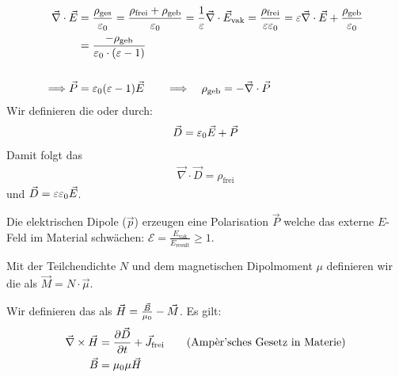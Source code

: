 \begin{align*}
    \vec{\nabla} \cdot \vec{E} &= \frac{\rho_{\text{ges}}}{\varepsilon_0} =
    \frac{\rho_{\text{frei}} + \rho_{\text{geb}}}{\varepsilon_0} =
    \frac{1}{\varepsilon} \vec{\nabla} \cdot \vec{E}_{\text{vak}} =
    \frac{\rho_{\text{frei}}}{\varepsilon \varepsilon_0} =
    \varepsilon \vec{\nabla} \cdot \vec{E} + \frac{\rho_{\text{geb}}}{\varepsilon_0}
    \\ &=
    \frac{- \rho_{\text{geb}}}{\varepsilon_0 \cdot (\varepsilon -1)}
    \\ \\
    \Longrightarrow \vec{P} &= \varepsilon_0 (\varepsilon -1) \vec{E}
    \quad \quad \Longrightarrow \quad
    \rho_{\text{geb}} = - \vec{\nabla} \cdot \vec{P}
\end{align*}
Wir definieren die  oder  durch:
\begin{align*}
    \vec{D} = \varepsilon_0 \vec{E} + \vec{P}
\end{align*}
Damit folgt das 
\begin{align*}
    \vec{\nabla} \cdot \vec{D} = \rho_{\text{frei}}
\end{align*}
und $\vec{D} = \varepsilon \varepsilon_0 \vec{E}$.

\vspace{1\baselineskip}

Die elektrischen Dipole ($\vec{p}$) erzeugen eine Polarisation $\vec{P}$ welche das externe
$E$-Feld im Material schwächen: $\mathcal{E} = \frac{E_{\text{vak}}}{E_{\text{result}}} \geq 1$.

\vspace{1\baselineskip}

Mit der Teilchendichte $N$ und dem magnetischen Dipolmoment $\mu$ definieren wir die
 als $\vec{M} = N \cdot \vec{\mu}$.

\vspace{1\baselineskip}

Wir definieren das  als $\vec{H} = \frac{\vec{B}}{\mu_0} - \vec{M}$.
Es gilt:
\begin{align*}
    \vec{\nabla} \times \vec{H} &= \frac{\partial \vec{D}}{\partial t} + \vec{J}_{\text{frei}} \quad \quad \text{(Ampèr'sches Gesetz in Materie)}
    \\
    \vec{B} &= \mu_0 \mu \vec{H}
\end{align*}
